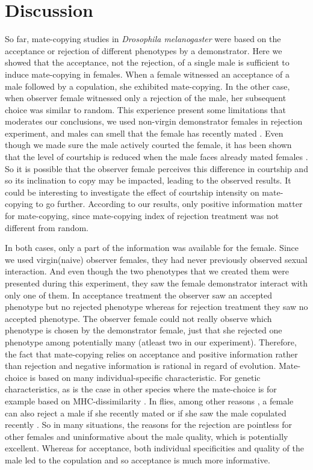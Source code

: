 \documentclass[a4paper, 12pt]{article}
\begin{document}
\clearpage
	


\section{Discussion}

So far, mate-copying studies in \textit{Drosophila melanogaster} were based on the acceptance or rejection of different phenotypes by a demonstrator.
Here we showed that the acceptance, not the rejection, of a single male is sufficient to induce mate-copying in females. 
When a female witnessed an acceptance of a male followed by a copulation, she exhibited mate-copying. 
In the other case, when observer female witnessed only a rejection of the male, her subsequent choice was similar to random. 
This experience present some limitations that moderates our conclusions, we used non-virgin demonstrator females in rejection experiment, and males can smell that the female has recently mated \parencite{jallon_few_1984}. 
Even though we made sure the male actively courted the female, it has been shown that the level of courtship is reduced when the male faces already mated females \parencite{cook_attractiveness_1975, tompkins_conditioned_1983}.
So it is possible that the observer female perceives this difference in courtship and so its inclination to copy may be impacted, leading to the observed results. It could be interesting to investigate the effect of courtship intensity on mate-copying to go further.
According to our results, only positive information matter for mate-copying, since mate-copying index of rejection treatment was not different from random.

In both cases, only a part of the information was available for the female. 
Since we used virgin(naive) observer females, they had never previously observed sexual interaction. 
And even though the two phenotypes that we created them were presented during this experiment, they saw the female demonstrator interact with only one of them. 
In acceptance treatment the observer saw an accepted phenotype but no rejected phenotype whereas for rejection treatment they saw no accepted phenotype. 
The observer female could not really observe which phenotype is chosen by the demonstrator female, just that she rejected one phenotype among potentially many (atleast two in our experiment).
Therefore, the fact that mate-copying relies on acceptance and positive information rather than rejection and negative information is rational in regard of evolution.
Mate-choice is based on many individual-specific characteristic. For genetic characteristics, as is the case in other species where the mate-choice is for example based on MHC-dissimilarity \parencite{wedekind_mhc_1995, landry_good_2001}. In flies, among other reasons \parencite{tennant_causes_2014}, a female can also reject a male if she recently mated \parencite{chapman_sex_2003} or if she saw the male copulated recently \parencite{loyau_when_2012}. 
So in many situations, the reasons for the rejection are pointless for other females and uninformative about the male quality, which is potentially excellent.
Whereas for acceptance, both individual specificities and quality of the male led to the copulation and so acceptance is much more informative.
\end{document}
